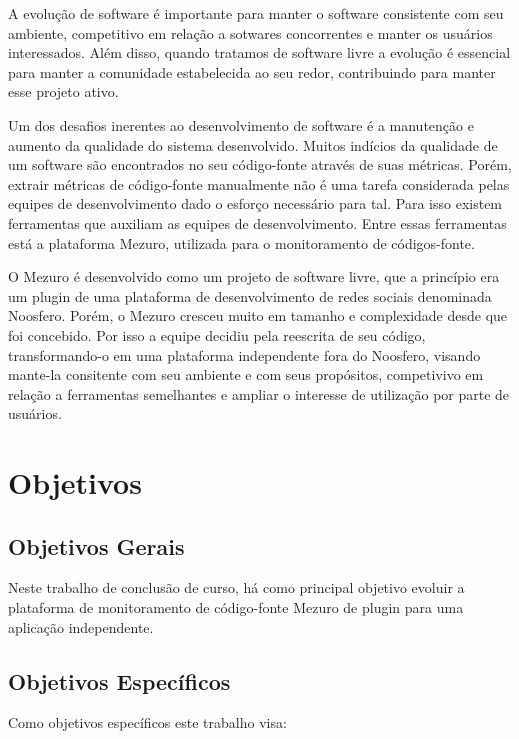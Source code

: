 A evolução de software é importante para manter o software consistente com seu ambiente, competitivo em relação a sotwares concorrentes e manter os usuários interessados. Além disso, quando tratamos de software livre a evolução é essencial para manter a comunidade estabelecida ao seu redor, contribuindo para manter esse projeto ativo.  

Um dos desafios inerentes ao desenvolvimento de software é a manutenção e aumento da qualidade do sistema desenvolvido. Muitos indícios da qualidade de um software são encontrados no seu código-fonte através de suas métricas. Porém, extrair métricas de código-fonte manualmente não é uma tarefa considerada pelas equipes de desenvolvimento dado o esforço necessário para tal. Para isso existem ferramentas que auxiliam as equipes de desenvolvimento. Entre essas ferramentas está a plataforma Mezuro, utilizada para o monitoramento de códigos-fonte.

O Mezuro é desenvolvido como um projeto de software livre, que a princípio era um plugin de uma plataforma de desenvolvimento de redes sociais denominada Noosfero. Porém, o Mezuro cresceu muito em tamanho e complexidade desde que foi concebido. Por isso a equipe decidiu pela reescrita de seu código, transformando-o em uma plataforma independente fora do Noosfero, visando mante-la consitente com seu ambiente e com seus propósitos, competivivo em relação a ferramentas semelhantes e ampliar o interesse de utilização por parte de usuários. 

\section{Objetivos}

\subsection{Objetivos Gerais}

Neste trabalho de conclusão de curso, há como principal objetivo evoluir a plataforma de monitoramento de código-fonte Mezuro de plugin para uma aplicação independente.

\subsection{Objetivos Específicos}

Como objetivos específicos este trabalho visa:

